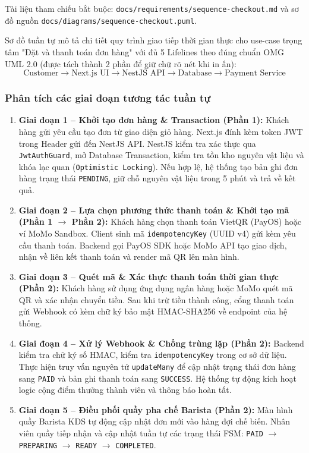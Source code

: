 \documentclass[11pt,a4paper]{article}
\begin{document}
Tài liệu tham chiếu bắt buộc: \texttt{docs/requirements/sequence-checkout.md} và sơ đồ nguồn \texttt{docs/diagrams/sequence-checkout.puml}.

Sơ đồ tuần tự mô tả chi tiết quy trình giao tiếp thời gian thực cho use-case trọng tâm "Đặt và thanh toán đơn hàng" với đủ 5 Lifelines theo đúng chuẩn OMG UML 2.0 (được tách thành 2 phần để giữ chữ rõ nét khi in ấn):
$$\text{Customer} \longrightarrow \text{Next.js UI} \longrightarrow \text{NestJS API} \longrightarrow \text{Database} \longrightarrow \text{Payment Service}$$

\subsubsection{Phân tích các giai đoạn tương tác tuần tự}
\begin{enumerate}[leftmargin=*]
    \item \textbf{Giai đoạn 1 -- Khởi tạo đơn hàng \& Transaction (Phần 1):} Khách hàng gửi yêu cầu tạo đơn từ giao diện giỏ hàng. Next.js đính kèm token JWT trong Header gửi đến NestJS API. NestJS kiểm tra xác thực qua \texttt{JwtAuthGuard}, mở Database Transaction, kiểm tra tồn kho nguyên vật liệu và khóa lạc quan (\texttt{Optimistic Locking}). Nếu hợp lệ, hệ thống tạo bản ghi đơn hàng trạng thái \texttt{PENDING}, giữ chỗ nguyên vật liệu trong 5 phút và trả về kết quả.
    \item \textbf{Giai đoạn 2 -- Lựa chọn phương thức thanh toán \& Khởi tạo mã (Phần 1 $\rightarrow$ Phần 2):} Khách hàng chọn thanh toán VietQR (PayOS) hoặc ví MoMo Sandbox. Client sinh mã \texttt{idempotencyKey} (UUID v4) gửi kèm yêu cầu thanh toán. Backend gọi PayOS SDK hoặc MoMo API tạo giao dịch, nhận về liên kết thanh toán và render mã QR lên màn hình.
    \item \textbf{Giai đoạn 3 -- Quét mã \& Xác thực thanh toán thời gian thực (Phần 2):} Khách hàng sử dụng ứng dụng ngân hàng hoặc MoMo quét mã QR và xác nhận chuyển tiền. Sau khi trừ tiền thành công, cổng thanh toán gửi Webhook có kèm chữ ký bảo mật HMAC-SHA256 về endpoint của hệ thống.
    \item \textbf{Giai đoạn 4 -- Xử lý Webhook \& Chống trùng lặp (Phần 2):} Backend kiểm tra chữ ký số HMAC, kiểm tra \texttt{idempotencyKey} trong cơ sở dữ liệu. Thực hiện truy vấn nguyên tử \texttt{updateMany} để cập nhật trạng thái đơn hàng sang \texttt{PAID} và bản ghi thanh toán sang \texttt{SUCCESS}. Hệ thống tự động kích hoạt logic cộng điểm thưởng thành viên và thông báo hoàn tất.
    \item \textbf{Giai đoạn 5 -- Điều phối quầy pha chế Barista (Phần 2):} Màn hình quầy Barista KDS tự động cập nhật đơn mới vào hàng đợi chế biến. Nhân viên quầy tiếp nhận và cập nhật tuần tự các trạng thái FSM: \texttt{PAID} $\rightarrow$ \texttt{PREPARING} $\rightarrow$ \texttt{READY} $\rightarrow$ \texttt{COMPLETED}.
\end{enumerate}
\end{document}
